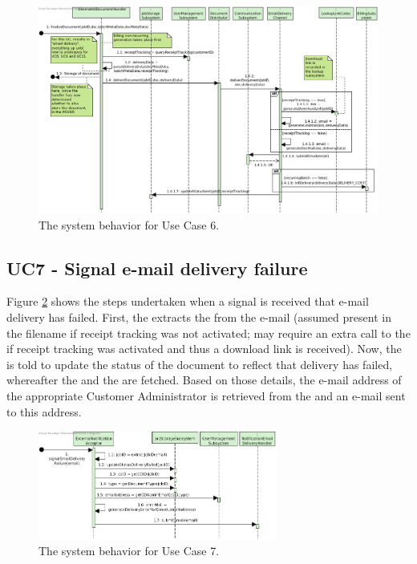 \begin{figure}[!htp]
    \centering
    \includegraphics[width=\textwidth]{figures/UC6 - Deliver document via e-mail.png}
    \caption{The system behavior for Use Case 6.
        }\label{fig:seq_uc6}
\end{figure}

\subsection{UC7 - Signal e-mail delivery failure}
Figure \ref{fig:seq_uc7} shows the steps undertaken when a signal is received that e-mail delivery has failed. First, the  extracts the  from the e-mail (assumed present in the filename if receipt tracking was not activated; may require an extra call to the  if receipt tracking was activated and thus a download link is received). Now, the  is told to update the status of the document to reflect that delivery has failed, whereafter the  and the  are fetched. Based on those details, the e-mail address of the appropriate Customer Administrator is retrieved from the  and an e-mail sent to this address.

\begin{figure}[!htp]
    \centering
    \includegraphics[width=0.7\textwidth]{figures/UC7 - Signal e-mail delivery failure.png}
    \caption{The system behavior for Use Case 7.
        }\label{fig:seq_uc7}
\end{figure}

